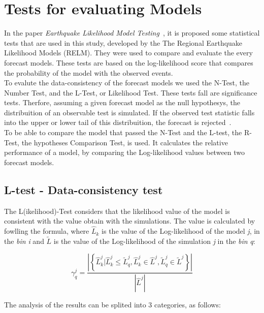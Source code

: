 \section{Tests for evaluating Models}\label{Tests}
In the paper {\it Earthquake Likelihood Model Testing}~\cite{schorlemmer2007earthquake}, it is proposed some statistical tests that are used in this study, developed by the The
Regional Earthquake Likelihood Models (RELM). They were used to compare
and evaluate the every forecast models. These tests are based on the
log-likelihood score that compares the probability of the model with
the observed events.\\

To evalute the data-consistency of the forecast models we used the
N-Test, the Number Test, and the L-Test, or Likelihood Test. These
tests fall are significance tests. Therfore, assuming a given forecast
model as the null hypothesys, the distribuition of an observable test
is simulated. If the observed test statistic falls into the upper or
lower tail of this distribuition, the forecast is
rejected~\cite{schorlemmer2010first}.\\

To be able to compare the model that passed the N-Test and the L-test,
the R-Test, the hypotheses Comparison Test, is used. It calculates the
relative performance of a model, by comparing the Log-likelihood
values between two forecast models.\\
\subsection{L-test - Data-consistency test}
The L(ikelihood)-Test considers that the likelihood value of the model
is consistent with the value obtain with the simulations. The value is
calculated by fowlling the formula, where $\widehat{L}_k$ is the value of the
Log-likelihood of the model {\it j}, in the {\it bin} {\it i} and
$\widetilde{L}$ is the value of the Log-likelihood of the simulation
{\it j} in the {\it bin} {\it q}:


\begin{equation}
\gamma^{j}_{q} = \frac{\left| \left\{ \widehat{L}^j_k | \widehat{L}^j_k \leq \widetilde{L}^j_q, \widehat{L}^j_k \in \widehat{L}^j, \widetilde{L}^j_q \in \widetilde{L}^j  \right\} \right|}  {|\widehat{L}^j|}
\end{equation}

The analysis of the results can be splited into 3 categories, as follows:

